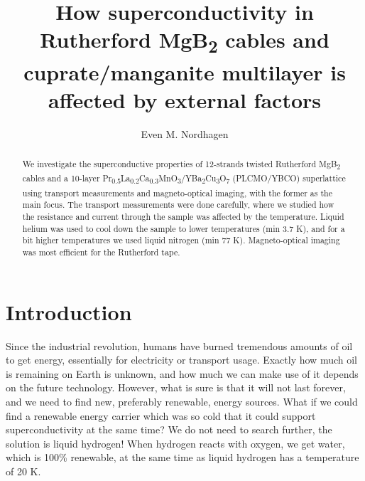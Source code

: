 \documentclass{comjnl}
\begin{document}
\title[Superconductivity in Rutherford \texorpdfstring{MgB\textsubscript{2}}{MgB2}  cables and cuprate/manganite multilayer]{How superconductivity in Rutherford \texorpdfstring{MgB\textsubscript{2}}{MgB2}  cables and cuprate/manganite multilayer is affected by external factors}
\author{Even M. Nordhagen}
 

 




\begin{abstract}
We investigate the superconductive properties of 12-strands twisted Rutherford \texorpdfstring{MgB\textsubscript{2}}{MgB2} cables and a 10-layer \texorpdfstring{Pr\textsubscript{0.5}La\textsubscript{0.2}Ca\textsubscript{0.3}MnO\textsubscript{3}/YBa\textsubscript{2}Cu\textsubscript{3}O\textsubscript{7}}{Pr0.5La0.2Ca0.3MnO3/YBa2Cu3O7} (PLCMO/YBCO) superlattice using transport measurements and magneto-optical imaging, with the former as the main focus. The transport measurements were done carefully, where we studied how the resistance and current through the sample was affected by the temperature. Liquid helium was used to cool down the sample to lower temperatures (min 3.7 K), and for a bit higher temperatures we used liquid nitrogen (min 77 K).  Magneto-optical imaging was most efficient for the Rutherford tape.
\end{abstract}

\maketitle


\section{Introduction}
Since the industrial revolution, humans have burned tremendous amounts of oil to get energy, essentially for electricity or transport usage. Exactly how much oil is remaining on Earth is unknown, and how much we can make use of it depends on the future technology. However, what is sure is that it will not last forever, and we need to find new, preferably renewable, energy sources. What if we could find a renewable energy carrier which was so cold that it could support superconductivity at the same time? We do not need to search further, the solution is liquid hydrogen! When hydrogen reacts with oxygen, we get water, which is 100\% renewable, at the same time as liquid hydrogen has a temperature of 20 K.
\end{document}
